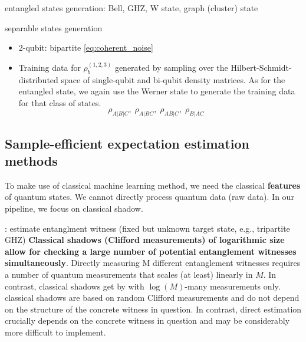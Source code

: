 \documentclass[
reprint,
aps,
pra,
floatfix,
]{revtex4-2}
\theoremstyle{plain}
\theoremstyle{definition}
\newcommand{\dm}{\rho}
\begin{document}
entangled states generation: Bell, GHZ, W state, graph (cluster) state

separable states generation
\begin{itemize}
	\item 2-qubit: bipartite \cref{eq:coherent_noise}
	\item Training data for $\dm_b^{(1,2,3)}$ generated by sampling over the Hilbert-Schmidt-distributed space of single-qubit and bi-qubit density matrices. As for the entangled state, we again use the Werner state to generate the training data for that class of states.
	\begin{equation}
		\dm_{A|B|C},\;
		\dm_{A|BC},\;
		\dm_{AB|C},\;
		\dm_{B|AC}
		\quad
	\end{equation}
\end{itemize}

\subsection{Sample-efficient expectation estimation methods}
To make use of classical machine learning method, we need the classical \textbf{features} of quantum states.
We cannot directly process quantum data (raw data).
In our pipeline, we focus on classical shadow.

 \cite{huangPredictingManyProperties2020}: estimate entanglment witness (fixed but unknown target state, e.g., tripartite GHZ)
\textbf{Classical shadows (Clifford measurements) of logarithmic size allow for checking a large number of potential entanglement witnesses simultaneously}.
Directly measuring M diﬀerent entanglement witnesses requires a number of quantum measurements that scales (at least) linearly in $M$. In contrast, classical shadows get by with $\log(M)$-many measurements only.
classical shadows are based on random Clifford measurements and do not depend on the structure of the concrete witness in question. In contrast, direct estimation crucially depends on the concrete witness in question and may be considerably more difficult to implement.
\end{document}
